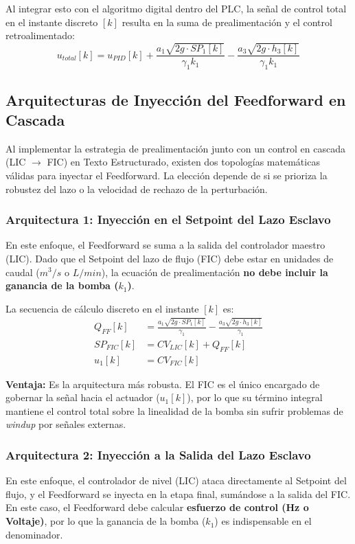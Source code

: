 Al integrar esto con el algoritmo digital dentro del PLC, la señal de control total en el instante discreto $[k]$ resulta en la suma de prealimentación y el control retroalimentado:
\begin{equation}
    u_{total}[k] = u_{PID}[k] + \frac{a_1 \sqrt{2g \cdot SP_1[k]}}{\gamma_1 k_1} - \frac{a_3 \sqrt{2g \cdot h_3[k]}}{\gamma_1 k_1}
\end{equation}

\clearpage
\subsection{Arquitecturas de Inyección del Feedforward en Cascada}

Al implementar la estrategia de prealimentación junto con un control en cascada (LIC $\rightarrow$ FIC) en Texto Estructurado, existen dos topologías matemáticas válidas para inyectar el Feedforward. La elección depende de si se prioriza la robustez del lazo o la velocidad de rechazo de la perturbación.

\subsubsection{Arquitectura 1: Inyección en el Setpoint del Lazo Esclavo}
En este enfoque, el Feedforward se suma a la salida del controlador maestro (LIC). Dado que el Setpoint del lazo de flujo (FIC) debe estar en unidades de caudal ($m^3/s$ o $L/min$), la ecuación de prealimentación \textbf{no debe incluir la ganancia de la bomba ($k_1$)}. 

La secuencia de cálculo discreto en el instante $[k]$ es:
\begin{align}
    Q_{FF}[k] &= \frac{a_1 \sqrt{2g \cdot SP_1[k]}}{\gamma_1} - \frac{a_3 \sqrt{2g \cdot h_3[k]}}{\gamma_1} \label{eq:ff_caudal} \\
    SP_{FIC}[k] &= CV_{LIC}[k] + Q_{FF}[k] \label{eq:sp_fic_sum} \\
    u_1[k] &= CV_{FIC}[k] \label{eq:u_arch1}
\end{align}

\textbf{Ventaja:} Es la arquitectura más robusta. El FIC es el único encargado de gobernar la señal hacia el actuador ($u_1[k]$), por lo que su término integral mantiene el control total sobre la linealidad de la bomba sin sufrir problemas de \textit{windup} por señales externas.

\subsubsection{Arquitectura 2: Inyección a la Salida del Lazo Esclavo}
En este enfoque, el controlador de nivel (LIC) ataca directamente al Setpoint del flujo, y el Feedforward se inyecta en la etapa final, sumándose a la salida del FIC. En este caso, el Feedforward debe calcular \textbf{esfuerzo de control (Hz o Voltaje)}, por lo que la ganancia de la bomba ($k_1$) es indispensable en el denominador.

